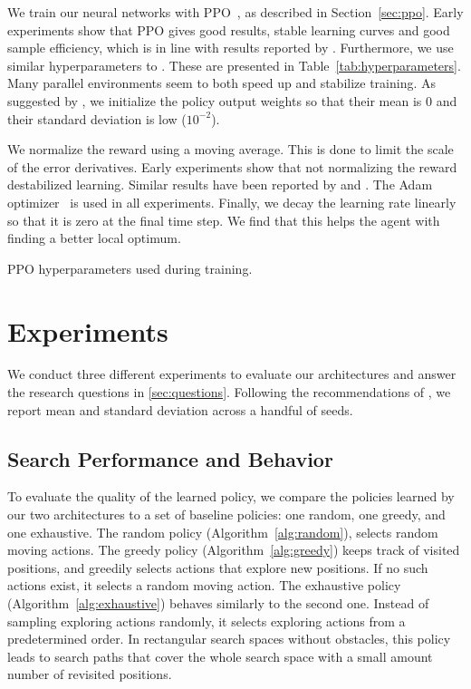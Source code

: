 We train our neural networks with PPO~\cite{schulman_proximal_2017}, as described in Section~\ref{sec:ppo}.
Early experiments show that PPO gives good results, stable learning curves and good sample efficiency, which is in line with results reported by \cite{andrychowicz_what_2020}.
Furthermore, we use similar hyperparameters to \cite{cobbe_leveraging_2020}.
These are presented in Table~\ref{tab:hyperparameters}.
Many parallel environments seem to both speed up and stabilize training.
As suggested by \cite{andrychowicz_what_2020}, we initialize the policy output weights so that their mean is 0 and their standard deviation is low (\(10^{-2}\)).

We normalize the reward using a moving average.
This is done to limit the scale of the error derivatives.
Early experiments show that not normalizing the reward destabilized learning. %
Similar results have been reported by \cite{andrychowicz_what_2020} and \cite{mnih_playing_2013}.
The Adam optimizer~\cite{kingma_adam_2017} is used in all experiments.
Finally, we decay the learning rate linearly so that it is zero at the final time step.
We find that this helps the agent with finding a better local optimum.

\begin{table}
    \centering
    \caption[PPO hyperparameters]{PPO hyperparameters used during training.}
    
    \label{tab:hyperparameters}
\end{table}

\section{Experiments}
\label{sec:experiments}

We conduct three different experiments to evaluate our architectures and answer the research questions in \ref{sec:questions}.
Following the recommendations of \cite{henderson_deep_2018,colas_hitchhikers_2019,agarwal_deep_2022}, we report mean and standard deviation across a handful of seeds.

\subsection{Search Performance and Behavior}

To evaluate the quality of the learned policy, we compare the policies learned by our two architectures to a set of baseline policies:
one random, one greedy, and one exhaustive.
The random policy (Algorithm~\ref{alg:random}), selects random moving actions.
The greedy policy (Algorithm~\ref{alg:greedy}) keeps track of visited positions, and greedily selects actions that explore new positions.
If no such actions exist, it selects a random moving action.
The exhaustive policy (Algorithm~\ref{alg:exhaustive}) behaves similarly to the second one.
Instead of sampling exploring actions randomly, it selects exploring actions from a predetermined order.
In rectangular search spaces without obstacles, this policy leads to search paths that cover the whole search space with a small amount number of revisited positions.

